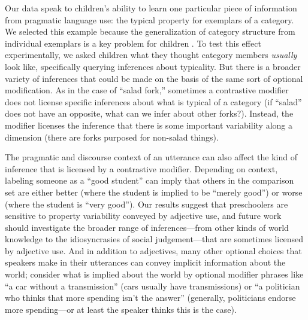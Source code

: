 \documentclass[man]{apa2}
\begin{document}
Our data speak to children's ability to learn one particular piece of information from pragmatic language use: the typical property for exemplars of a category. We selected this example because the generalization of category structure from individual exemplars is a key problem for children \cite{markman1991}. To test this effect experimentally, we asked children what they thought category members \emph{usually} look like, specifically querying inferences about typicality. But there is a broader variety of inferences that could be made on the basis of the same sort of optional modification. As in the case of ``salad fork,'' sometimes a contrastive modifier does not license specific inferences about what is typical of a category (if ``salad'' does not have an opposite, what can we infer about other forks?). Instead, the modifier licenses the inference that there is some important variability along a dimension (there are forks purposed for non-salad things). 

The pragmatic and discourse context of an utterance can also affect the kind of inference that is licensed by a contrastive modifier. Depending on context, labeling someone as a ``good student'' can imply that others in the comparison set are either better (where the student is implied to be ``merely good'') or worse (where the student is ``very good''). Our results suggest that preschoolers are sensitive to property variability conveyed by adjective use, and future work should investigate the broader range of inferences---from other kinds of world knowledge to the idiosyncrasies of social judgement---that are sometimes licensed by adjective use. And in addition to adjectives, many other optional choices that speakers make in their utterances can convey implicit information about the world; consider what is implied about the world by optional modifier phrases like ``a car without a transmission'' (cars usually have transmissions) or ``a politician who thinks that more spending isn't the answer'' (generally, politicians endorse more spending---or at least the speaker thinks this is the case). 

\end{document}
